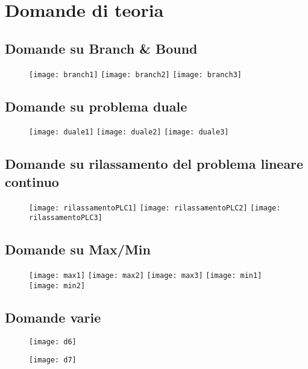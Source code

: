 \documentclass[\main/main.tex]{subfiles}
\begin{document}
\section{Domande di teoria}

\subsection{Domande su Branch \& Bound}
\begin{figure}
  \texttt{[image: branch1]}
  \texttt{[image: branch2]}
  \texttt{[image: branch3]}
\end{figure}
\subsection{Domande su problema duale}
\begin{figure}
  \texttt{[image: duale1]}
  \texttt{[image: duale2]}
  \texttt{[image: duale3]}
\end{figure}
\subsection{Domande su rilassamento del problema lineare continuo}
\begin{figure}
  \texttt{[image: rilassamentoPLC1]}
  \texttt{[image: rilassamentoPLC2]}
  \texttt{[image: rilassamentoPLC3]}
\end{figure}
\subsection{Domande su Max/Min}
\begin{figure}
  \texttt{[image: max1]}
  \texttt{[image: max2]}
  \texttt{[image: max3]}
  \texttt{[image: min1]}
  \texttt{[image: min2]}
\end{figure}
\subsection{Domande varie}
\begin{figure}
  \texttt{[image: d6]}
\end{figure}
\begin{figure}
  \texttt{[image: d7]}
\end{figure}
\end{document}
